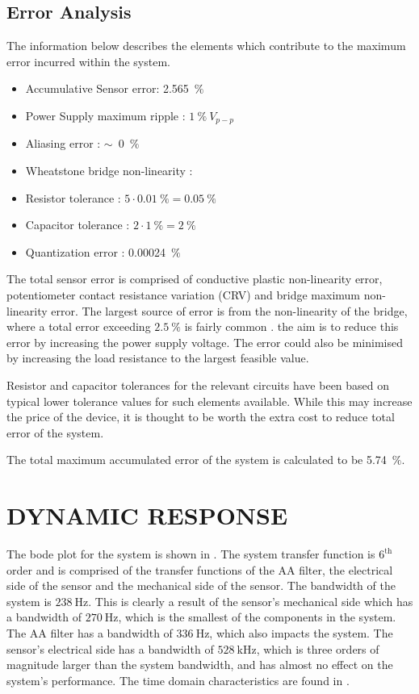 \documentclass[10pt,twocolumn]{witseiepaper}
\begin{document}
\subsection{Error Analysis}

The information below describes the elements which contribute to the maximum error incurred within the system.

\begin{itemize}
	\item Accumulative Sensor error: 2.565~$\%$
	\item Power Supply maximum ripple : $1~\%~V_{p-p}$
	\item Aliasing error : $\sim$~0~$\%$
	\item Wheatstone bridge non-linearity : 
	\item Resistor tolerance : $5\cdot0.01~\% = 0.05~\%$
	\item Capacitor tolerance : $2\cdot1~\% = 2~\%$
	\item Quantization error : 0.00024~$\%$
\end{itemize}

The total sensor error is comprised of conductive plastic non-linearity error, potentiometer contact resistance variation (CRV) and bridge maximum non-linearity error. The largest source of error is from the non-linearity of the bridge, where a total error exceeding $2.5~\%$ is fairly common \cite{nonlinearity}. the aim is to reduce this error by increasing the power supply voltage. The error could also be minimised by increasing the load resistance to the largest feasible value.

Resistor and capacitor tolerances for the relevant circuits have been based on typical lower tolerance values for such elements available. While this may increase the price of the device, it is thought to be worth the extra cost to reduce total error of the system.

The total maximum accumulated error of the system is calculated to be 5.74~$\%$.

\section{DYNAMIC RESPONSE}

The bode plot for the system is shown in . The system transfer function is $\mathrm{6^{th}}$ order and is comprised of the transfer functions of the AA filter, the electrical side of the sensor and the mechanical side of the sensor. The bandwidth of the system is $238~\mathrm{Hz}$. This is clearly a result of the sensor's mechanical side which has a bandwidth of $270~\mathrm{Hz}$, which is the smallest of the components in the system. The AA filter has a bandwidth of $336~\mathrm{Hz}$, which also impacts the system. The sensor's electrical side has a bandwidth of $528~\mathrm{kHz}$, which is three orders of magnitude larger than the system bandwidth, and has almost no effect on the system's performance. The time domain characteristics are found in .
\end{document}
